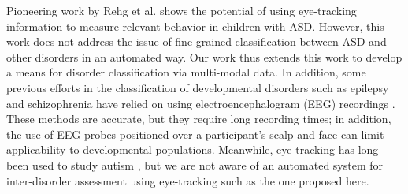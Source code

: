 \documentclass{llncs}
\begin{document}
  Pioneering work by Rehg et al. \cite{RAG33} shows the potential of using eye-tracking information to measure relevant behavior in children with ASD.
  However, this work does not address the issue of fine-grained classification between ASD and other disorders in an automated way. Our work thus extends this work to develop a means for disorder classification via multi-modal data.
  In addition, some previous efforts in the classification of developmental disorders such as epilepsy and schizophrenia have relied on using electroencephalogram (EEG) recordings \cite{Kumar}. These methods are accurate, but they require  long recording times; in addition, the use of EEG probes positioned over a participant's scalp and face can limit applicability to developmental populations. Meanwhile, eye-tracking has long been used to study autism \cite{Boraston,hashemi}, but we are not aware of an automated system for inter-disorder assessment using eye-tracking such as the one proposed here.
\end{document}
